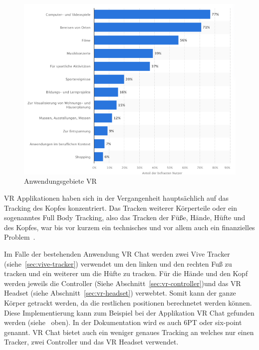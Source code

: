 \begin{figure}
    \begin{center}
        \includegraphics[scale=0.4]{pics/statistic_usage_vr}
    \end{center}
    \caption{Anwendungsgebiete VR~\cite{BITKOM_2021}}
    \label{fig:statistic_usage_vr}
\end{figure}

VR Applikationen haben sich in der Vergangenheit hauptsächlich auf das Tracking des Kopfes konzentriert.
Das Tracken weiterer Körperteile oder ein sogenanntes Full Body Tracking, also das Tracken der Füße, Hände, Hüfte und des Kopfes, war bis vor kurzem ein technisches und vor allem auch ein finanzielles Problem~\cite{PAVEL_NUZHDIN_2020}.

Im Falle der bestehenden Anwendung VR Chat werden zwei Vive Tracker (siehe~\ref{sec:vive-tracker}) verwendet um den linken und den rechten Fuß zu tracken und ein weiterer um die Hüfte zu tracken.
Für die Hände und den Kopf werden jeweils die Controller (Siehe Abschnitt~\ref{sec:vr-controller})und das VR Headset (siehe Abschnitt~\ref{sec:vr-headset}) verwebtet.
Somit kann der ganze Körper getrackt werden, da die restlichen positionen berechnetet werden können.
Diese Implementierung kann zum Beispiel bei der Applikation VR Chat gefunden werden (siehe~\cite{VRCHAT_DOCS_2021} oben).
In der Dokumentation wird es auch 6PT oder six-point genannt.
VR Chat bietet auch ein weniger genaues Tracking an welches nur einen Tracker, zwei Controller und das VR Headset verwendet.

